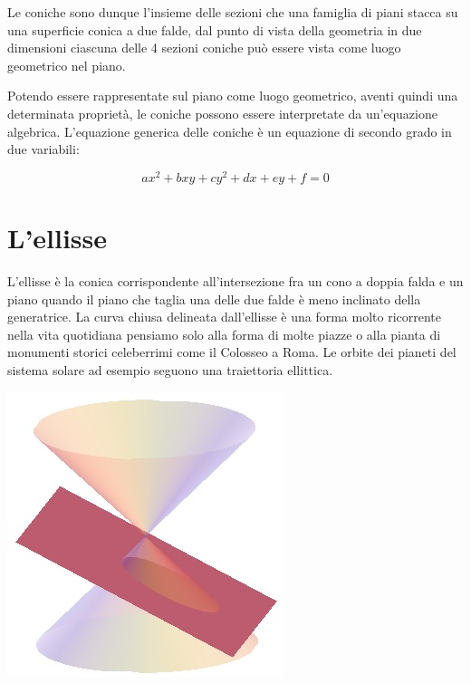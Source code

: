 Le coniche sono dunque l'insieme delle sezioni che una famiglia di piani 
stacca su una superficie conica a due falde, dal punto di vista della 
geometria in due dimensioni ciascuna delle 4 sezioni coniche può essere 
vista come luogo geometrico nel piano.

Potendo essere rappresentate sul piano come luogo geometrico, aventi quindi 
una determinata proprietà, le coniche possono essere interpretate da 
un'equazione algebrica. L'equazione generica delle coniche è un equazione 
di secondo grado in due variabili: 

\[ax^{2}+bxy+cy^{2}+dx+ey+f=0\] 

\section{L'ellisse}
\label{sec:ellisse_}

\noindent\begin{minipage}{.75\textwidth}
  L'ellisse è la conica corrispondente all'intersezione fra un cono a 
doppia falda e un piano quando il piano che taglia una delle due falde è 
meno inclinato della generatrice. La curva chiusa delineata dall'ellisse è 
una forma molto ricorrente nella vita quotidiana pensiamo solo alla forma 
di molte piazze o alla pianta di monumenti storici celeberrimi come il 
Colosseo a Roma. Le orbite dei pianeti del sistema solare ad esempio seguono 
una traiettoria ellittica.
\end{minipage}
\hspace{.5cm}
\begin{minipage}{.2\textwidth}
  \includegraphics[width=\textwidth]{img/elisse2.jpg}
\end{minipage} 

